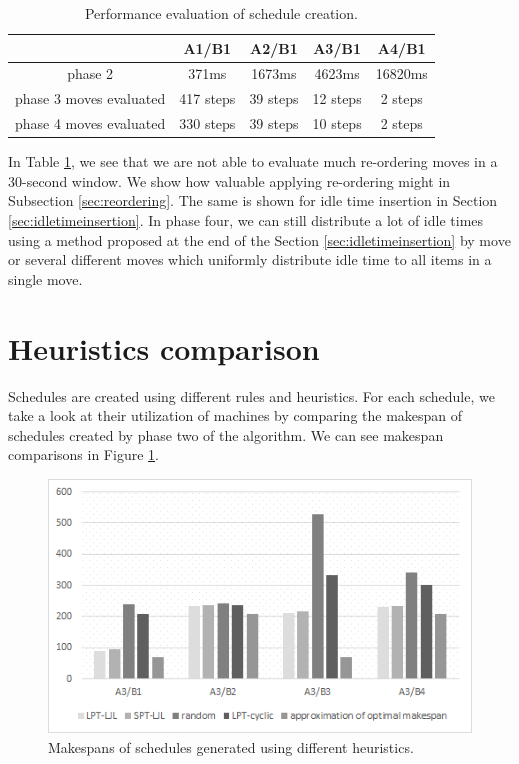 \documentclass{ctuthesis}
\begin{document}
\begin{table}[H]
\begin{tabular}{ |c| c c c c|} 
\hline
 & A1/B1 & A2/B1 & A3/B1 & A4/B1\\ 
\hline
phase 2 & 371ms & 1673ms & 4623ms & 16820ms \\
\hline
phase 3 moves evaluated & 417 steps & 39 steps & 12 steps & 2 steps \\ 
\hline
phase 4 moves evaluated & 330 steps & 39 steps & 10 steps & 2 steps \\ 
\hline
\end{tabular}
\caption{Performance evaluation of schedule creation.} \label{tab:perform}
\end{table}

In Table \ref{tab:perform}, we see that we are not able to evaluate much re-ordering moves in a 30-second window. We show how valuable applying re-ordering might in Subsection \ref{sec:reordering}. The same is shown for idle time insertion in Section \ref{sec:idletimeinsertion}. In phase four, we can still distribute a lot of idle times using a method proposed at the end of the Section \ref{sec:idletimeinsertion} by move or several different moves which uniformly distribute idle time to all items in a single move. 

\section{Heuristics comparison}
\label{sec:heuristiccomparison}
Schedules are created using different rules and heuristics. For each schedule, we take a look at their utilization of machines by comparing the makespan of schedules created by phase two of the algorithm. We can see makespan comparisons in Figure \ref{fig:c1}. 

\begin{figure}[H]
\includegraphics[width=\linewidth]{c1.png}
\caption{Makespans of schedules generated using different heuristics.}
\label{fig:c1}
\end{figure}
\end{document}
